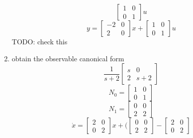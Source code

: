 \begin{enumerate}
\begin{equation}
      \begin{bmatrix}
        1 & 0 \\
        0 & 1
      \end{bmatrix}u
    \end{equation}
    \begin{equation}
      y =
      \begin{bmatrix}
        -2 & 0 \\
        2 & 0
      \end{bmatrix}x +
      \begin{bmatrix}
        1 & 0 \\
        0 & 1
      \end{bmatrix}u
    \end{equation}
    {\LARGE \color{red} TODO: check this}
  \item obtain the observable canonical form\\
    \begin{equation}
      \frac 1 {s+2}
      \begin{bmatrix}
        s & 0 \\
        2 & s+2
      \end{bmatrix}
    \end{equation}
    \begin{equation}
      N_0 =
      \begin{bmatrix}
        1 & 0 \\
        0 & 1
      \end{bmatrix}
    \end{equation}
    \begin{equation}
      N_1 =
      \begin{bmatrix}
        0 & 0 \\
        2 & 2
      \end{bmatrix}
    \end{equation}
    \begin{equation}
      \dot x =
      \begin{bmatrix}
        2 & 0 \\
        0 & 2
      \end{bmatrix}x +
      \big (
      \begin{bmatrix}
        0 & 0 \\
        2 & 2
      \end{bmatrix} -
      \begin{bmatrix}
        2 & 0 \\
        0 & 2
      \end{bmatrix}

\end{equation}
\end{enumerate}
